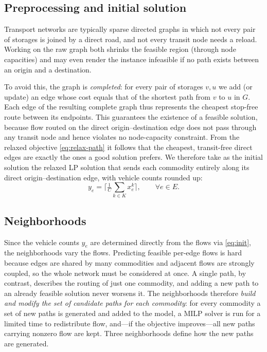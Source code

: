\documentclass[runningheads]{llncs}
\newcommand{\E}{E}
\begin{document}
\subsection{Preprocessing and initial solution}
Transport networks are typically sparse directed graphs in which not every
pair of storages is joined by a direct road, and not every transit node needs
a reload. Working on the raw graph both shrinks the feasible region (through
node capacities) and may even render the instance infeasible if no path exists
between an origin and a destination.

To avoid this, the graph is \emph{completed}: for every pair of storages
$v,u$ we add (or update) an edge whose cost equals that of the shortest path
from $v$ to $u$ in $G$. Each edge of the resulting complete graph thus
represents the cheapest stop-free route between its endpoints. This guarantees
the existence of a feasible solution, because flow routed on the direct
origin--destination edge does not pass through any transit node and hence
violates no node-capacity constraint. From the relaxed objective
\eqref{eq:relax-path} it follows that the cheapest, transit-free direct edges
are exactly the ones a good solution prefers. We therefore take as the initial
solution the relaxed LP solution that sends each commodity entirely along its
direct origin--destination edge, with vehicle counts rounded up:
\begin{equation}
y_e=\Big\lceil \tfrac1C\sum_{k\in K} x^k_e\Big\rceil, \qquad \forall e\in \E.
\label{eq:init}
\end{equation}

\subsection{Neighborhoods}
Since the vehicle counts $y_e$ are determined directly from the flows via
\eqref{eq:init}, the neighborhoods vary the flows. Predicting feasible
per-edge flows is hard because edges are shared by many commodities and
adjacent flows are strongly coupled, so the whole network must be considered
at once. A single path, by contrast, describes the routing of just one
commodity, and adding a new path to an already feasible solution never worsens
it. The neighborhoods therefore \emph{build and modify the set of candidate
paths for each commodity}: for every commodity a set of new paths is generated
and added to the model, a MILP solver is run for a limited time to
redistribute flow, and---if the objective improves---all new paths carrying
nonzero flow are kept. Three neighborhoods define how the new paths are
generated.
\end{document}
